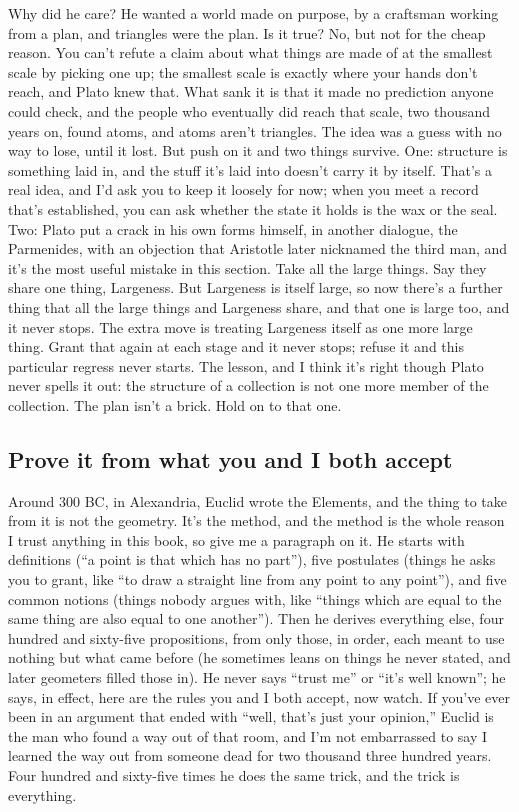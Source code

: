 \documentclass[11pt,twoside]{article}
\theoremstyle{thielethm}
\theoremstyle{thieledef}
\theoremstyle{thieledef}
\theoremstyle{thieledef}
\theoremstyle{thielethm}
\theoremstyle{thieleobs}
\theoremstyle{thielethm}
\begin{document}
Why did he care? He wanted a world made on purpose, by a craftsman working from a plan, and triangles were the plan. Is it true? No, but not for the cheap reason. You can't refute a claim about what things are made of at the smallest scale by picking one up; the smallest scale is exactly where your hands don't reach, and Plato knew that. What sank it is that it made no prediction anyone could check, and the people who eventually did reach that scale, two thousand years on, found atoms, and atoms aren't triangles. The idea was a guess with no way to lose, until it lost. But push on it and two things survive. One: structure is something laid in, and the stuff it's laid into doesn't carry it by itself. That's a real idea, and I'd ask you to keep it loosely for now; when you meet a record that's established, you can ask whether the state it holds is the wax or the seal. Two: Plato put a crack in his own forms himself, in another dialogue, the Parmenides, with an objection that Aristotle later nicknamed the third man, and it's the most useful mistake in this section. Take all the large things. Say they share one thing, Largeness. But Largeness is itself large, so now there's a further thing that all the large things and Largeness share, and that one is large too, and it never stops. The extra move is treating Largeness itself as one more large thing. Grant that again at each stage and it never stops; refuse it and this particular regress never starts. The lesson, and I think it's right though Plato never spells it out: the structure of a collection is not one more member of the collection. The plan isn't a brick. Hold on to that one.

\subsection{Prove it from what you and I both accept}

Around 300 BC, in Alexandria, Euclid wrote the Elements, and the thing to take from it is not the geometry. It's the method, and the method is the whole reason I trust anything in this book, so give me a paragraph on it. He starts with definitions (``a point is that which has no part''), five postulates (things he asks you to grant, like ``to draw a straight line from any point to any point''), and five common notions (things nobody argues with, like ``things which are equal to the same thing are also equal to one another''). Then he derives everything else, four hundred and sixty-five propositions, from only those, in order, each meant to use nothing but what came before (he sometimes leans on things he never stated, and later geometers filled those in). He never says ``trust me'' or ``it's well known''; he says, in effect, here are the rules you and I both accept, now watch. If you've ever been in an argument that ended with ``well, that's just your opinion,'' Euclid is the man who found a way out of that room, and I'm not embarrassed to say I learned the way out from someone dead for two thousand three hundred years. Four hundred and sixty-five times he does the same trick, and the trick is everything.
\end{document}
